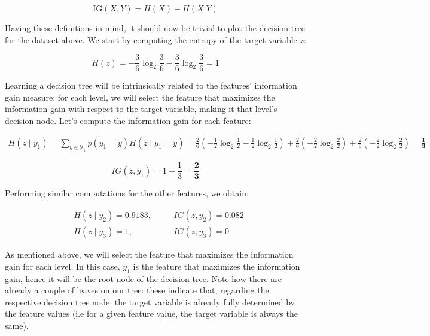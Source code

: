 \documentclass[12pt]{article}
\begin{document}
\begin{enumerate}[leftmargin=\labelsep]
        \begin{equation*}
          \text{IG}(X, Y) = H(X) - H(X|Y)
        \end{equation*}

        Having these definitions in mind, it should now be trivial to plot the decision tree
        for the dataset above. We start by computing the entropy of the target variable $z$:

        \begin{equation*}
          H(z) = -\frac{3}{6} \log_2 \frac{3}{6} - \frac{3}{6} \log_2 \frac{3}{6} = 1
        \end{equation*}

        Learning a decision tree will be intrinsically related to the features' information gain
        measure: for each level, we will select the feature that maximizes the information gain
        with respect to the target variable, making it that level's decision node.
        Let's compute the information gain for each feature:

        \begin{equation*}
          \begin{aligned}
            H(z \mid y_1) = \sum_{y \in \mathcal{Y}_1} p(y_1 = y) H(z \mid y_1 = y)
            = \frac{2}{6} \left(-\frac{1}{2} \log_2 \frac{1}{2} - \frac{1}{2} \log_2 \frac{1}{2}\right)
            + \frac{2}{6} \left(-\frac{2}{2} \log_2 \frac{2}{2}\right)
            + \frac{2}{6} \left(-\frac{2}{2} \log_2 \frac{2}{2}\right)
            = \mathbf{\frac{1}{3}}
          \end{aligned}
        \end{equation*}

        \begin{equation*}
          IG(z, y_1)    = 1 - \frac{1}{3} = \mathbf{\frac{2}{3}}
        \end{equation*}

        Performing similar computations for the other features, we obtain:

        \begin{equation*}
          \begin{aligned}
             & H(z \mid y_2) = 0.9183, \quad &  & IG(z, y_2) = 0.082 \\
             & H(z \mid y_3) = 1, \quad      &  & IG(z, y_3) = 0
          \end{aligned}
        \end{equation*}

        As mentioned above, we will select the feature that maximizes the information gain
        for each level. In this case, $y_1$ is the feature that maximizes the information gain,
        hence it will be the root node of the decision tree. Note how there are already
        a couple of leaves on our tree: these indicate that, regarding the respective
        decision tree node, the target variable is already fully determined by the feature
        values (i.e for a given feature value, the target variable is always the same).


\end{enumerate}
\end{document}
